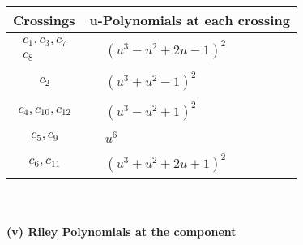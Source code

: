 \documentclass[1p]{elsarticle_modified}
\theoremstyle{definition}
\begin{document}
\begin{tabular}{m{50pt}|m{274pt}}
Crossings & \hspace{64pt}u-Polynomials at each crossing \\
\hline $$\begin{aligned}c_{1},c_{3},c_{7}\\c_{8}\end{aligned}$$&$\begin{aligned}
&(u^3- u^2+2 u-1)^2
\end{aligned}$\\
\hline $$\begin{aligned}c_{2}\end{aligned}$$&$\begin{aligned}
&(u^3+u^2-1)^2
\end{aligned}$\\
\hline $$\begin{aligned}c_{4},c_{10},c_{12}\end{aligned}$$&$\begin{aligned}
&(u^3- u^2+1)^2
\end{aligned}$\\
\hline $$\begin{aligned}c_{5},c_{9}\end{aligned}$$&$\begin{aligned}
&u^6
\end{aligned}$\\
\hline $$\begin{aligned}c_{6},c_{11}\end{aligned}$$&$\begin{aligned}
&(u^3+u^2+2 u+1)^2
\end{aligned}$\\
\hline
\end{tabular}\\~\\
\newpage\renewcommand{\arraystretch}{1}
\flushleft \textbf{(v) Riley Polynomials at the component}\newline \\
\end{document}
